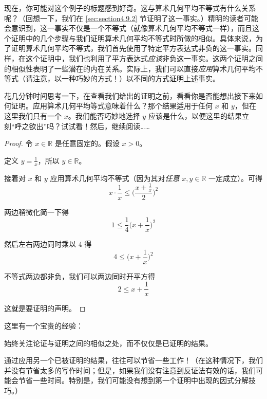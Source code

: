 现在，你可能对这个例子的标题感到好奇。这与算术几何平均不等式有什么关系呢？（回想一下，我们在 \ref{sec:section4.9.2} 节证明了这一事实。）精明的读者可能会意识到，这一事实不仅是一个不等式（就像算术几何平均不等式一样），而且这个证明中的几个步骤与我们证明算术几何平均不等式时所做的相似。具体来说，为了证明算术几何平均不等式，我们首先使用了特定平方表达式非负的这一事实。同样，在这个证明中，我们也利用了平方表达式\emph{应该}非负这一事实。这两个证明之间的相似性表明了一些潜在的内在关系。实际上，我们可以直接\emph{应用}算术几何平均不等式（请注意，以一种巧妙的方式！）以不同的方式证明上述事实。

花几分钟时间思考一下，在查看我们给出的证明之前，看看你是否能想出接下来如何证明。应用算术几何平均等式意味着什么？那个结果适用于任何 $x$ 和 $y$，但在这里我们只有一个 $x$。我们能否巧妙地选择 $y$ 应该是什么，以便这里的结果立刻``呼之欲出''吗？试试看！然后，继续阅读……

\begin{proof}
    令 $x \in \mathbb{R}$ 是任意固定的。假设 $x>0$。

    定义 $y = \frac{1}{x}$，所以 $y \in \mathbb{R}$。

    接着对 $x$ 和 $y$ 应用算术几何平均不等式（因为其对\emph{任意} $x,y \in \mathbb{R}$ 一定成立）。可得
    \[x \cdot \frac{1}{x} \le \Big(\frac{x+\frac{1}{x}}{2}\Big)^2\]

    两边稍微化简一下得
    \[1 \le \frac{1}{4}\Big(x+\frac{1}{x}\Big)^2\]

    然后左右两边同时乘以 $4$ 得
    \[4 \le \Big(x+\frac{1}{x}\Big)^2\]

    不等式两边都非负，我们可以两边同时开平方得
    \[2 \le x+\frac{1}{x}\]

    这就是要证明的声明。
\end{proof}

这里有一个宝贵的经验：

\begin{center}
    始终关注论证与证明之间的相似之处，而不仅仅是已证明的结果。
\end{center}

通过应用另一个已被证明的结果，往往可以节省一些工作！（在这种情况下，我们并没有节省太多的写作时间；但是，如果我们没有注意到反证法有效的话，我们可能会节省一些时间。特别是，我们可能没有想到第一个证明中出现的因式分解技巧。）